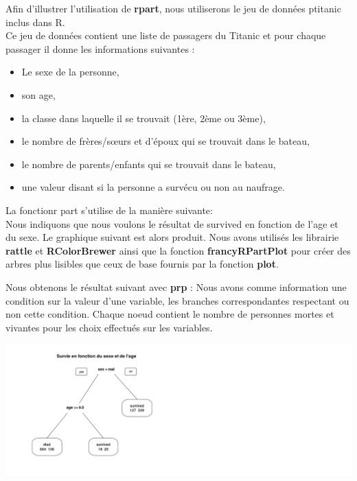 \documentclass[compress]{beamer}
\begin{document}
\begin{frame}
Afin d'illustrer l'utilisation de \textbf{rpart}, nous utiliserons le jeu de données \textrm{ptitanic} inclus dans R.\\
Ce jeu de données contient une liste de passagers du Titanic et pour chaque passager il donne les informations suivantes :\\
\begin{itemize}
 \item Le sexe de la personne,
 \item son age,
 \item la classe dans laquelle il se trouvait (1ère, 2ème ou 3ème),
 \item le nombre de frères/sœurs et d'époux qui se trouvait dans le bateau,
 \item le nombre de parents/enfants qui se trouvait dans le bateau,
 \item une valeur disant si la personne a survécu ou non au naufrage.
\end{itemize}
\end{frame}
\begin{frame}
La fonctionr part s'utilise de la manière suivante: \\

Nous indiquons que nous voulons le résultat de \textrm{survived} en fonction de l'age et du sexe.
Le graphique suivant est alors produit. Nous avons utilisés les librairie \textbf{rattle} et \textbf{RColorBrewer} ainsi que la fonction \textbf{francyRPartPlot} pour 
créer des arbres plus lisibles que ceux de base fournis par la fonction \textbf{plot}.
\end{frame}
\begin{frame}
Nous obtenons le résultat suivant avec \textbf{prp} :
Nous avons comme information une condition sur la valeur d'une variable, les branches correspondantes respectant ou non cette condition.
Chaque noeud contient le nombre de personnes mortes et vivantes pour les choix effectués sur les variables.

      \begin{center}
            \includegraphics[width=\textwidth,height=0.8\textheight,keepaspectratio]{survie-sexe-age-base.png}
        \end{center}
\end{frame}
\end{document}

